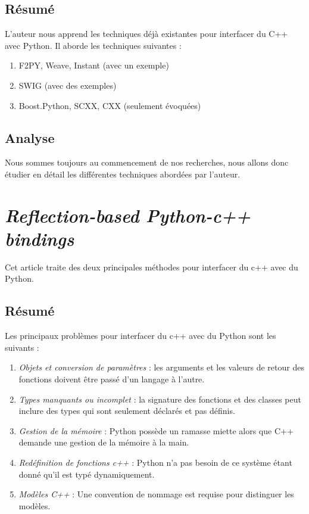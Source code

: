 \documentclass[11pt, french, screen]{report-rd-info}
\begin{document}
\subsection{Résumé}

L'auteur nous apprend les techniques déjà existantes pour interfacer du C++ avec Python. Il aborde les techniques suivantes :
\begin{enumerate}
\item F2PY, Weave, Instant (avec un exemple)
\item SWIG (avec des exemples)
\item Boost.Python, SCXX, CXX (seulement évoquées)
\end{enumerate}

\subsection{Analyse}

Nous sommes toujours au commencement de nos recherches, nous allons donc étudier en détail les différentes techniques abordées par l'auteur.

\section{\emph{Reflection-based Python-c++ bindings}}

Cet article \cite{2004RBPCBGenrowicz} traite des deux principales méthodes pour interfacer du c++ avec du Python.

\subsection{Résumé}

Les principaux problèmes pour interfacer du c++ avec du Python sont les suivants :
\begin{enumerate}
\item \emph{Objets et conversion de paramètres} : les arguments et les valeurs de retour des fonctions doivent être passé d'un langage à l'autre.
\item \emph{Types manquants ou incomplet} : la signature des fonctions et des classes peut inclure des types qui sont seulement déclarés et pas définis.
\item \emph{Gestion de la mémoire} : Python possède un ramasse miette alors que C++ demande une gestion de la mémoire à la main.
\item \emph{Redéfinition de fonctions c++} : Python n'a pas besoin de ce système étant donné qu'il est typé dynamiquement.
\item \emph{Modèles C++} : Une convention de nommage est requise pour distinguer les modèles.
\end{enumerate}
\end{document}
